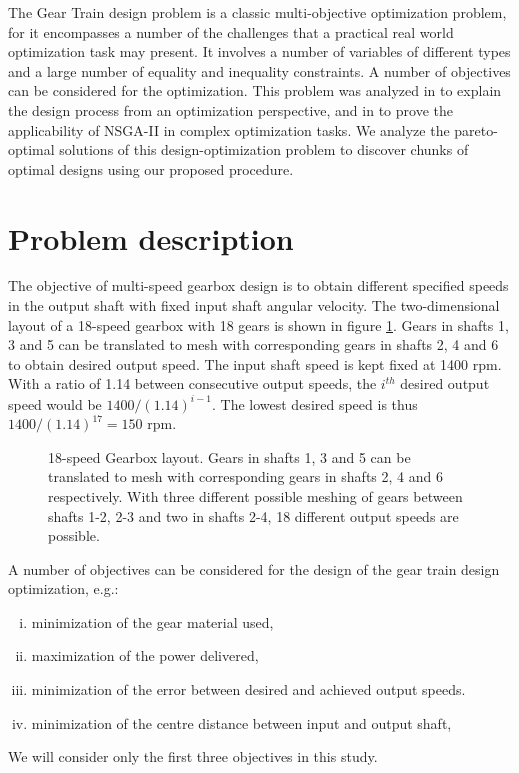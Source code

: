 The Gear Train design problem is a classic multi-objective optimization
problem, for it encompasses a number of the challenges that a practical
real world optimization task may present. It involves a number of variables
of different types and a large number of equality and inequality
constraints. A number of objectives can be considered for the
optimization. This problem was analyzed in \citep{agogino90} to explain the
design process from an optimization perspective, and in \citep{debgt} to
prove the applicability of NSGA-II in complex optimization tasks. We
analyze the pareto-optimal solutions of this design-optimization problem to
discover chunks of optimal designs using our proposed procedure.


\section{Problem description}
\label{problem}
The objective of multi-speed gearbox design is to obtain different
specified speeds in the output shaft with fixed input shaft angular
velocity. The two-dimensional layout of a 18-speed gearbox with 18 gears is
shown in figure \ref{geartrain}. Gears in shafts 1, 3 and 5 can be
translated to mesh with corresponding gears in shafts 2, 4 and 6 to obtain
desired output speed. The input shaft speed is kept fixed at 1400 rpm. With
a ratio of 1.14 between consecutive output speeds, the $i^{th}$ desired
output speed would be $1400/(1.14)^{i-1}$.  The lowest desired speed is
thus $1400/(1.14)^{17} = 150$ rpm.

\begin{figure}[ht]\begin{center}
 \caption{18-speed Gearbox layout. Gears in shafts 1, 3 and 5 can be
   translated to mesh with corresponding gears in shafts 2, 4 and 6
   respectively. With three different possible meshing of gears between
   shafts 1-2, 2-3 and two in shafts 2-4, 18 different output speeds are
   possible.}
 \label{geartrain}
\end{center}\end{figure}

A number of objectives can be considered for the design of the gear 
train design optimization, e.g.:
\begin{enumerate}[(i)]
\item minimization of the gear material used,
\item maximization of the power delivered, 
\item minimization of the error between desired and achieved output 
speeds.
\item minimization of the centre distance between input and output 
shaft,
\end{enumerate}
We will consider only the first three objectives in this study.

